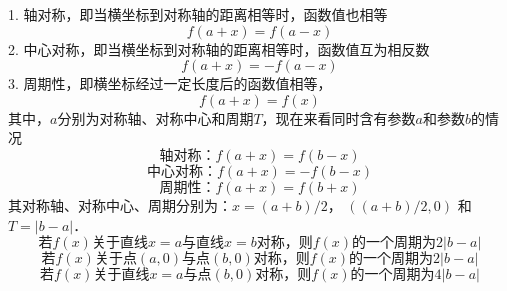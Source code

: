 1. 轴对称，即当横坐标到对称轴的距离相等时，函数值也相等
\begin{equation}
f\left( {a + x} \right) = f\left( {a - x} \right)
\end{equation}
2. 中心对称，即当横坐标到对称轴的距离相等时，函数值互为相反数
\begin{equation}
f\left( {a + x} \right) =  - f\left( {a - x} \right)
\end{equation}
3. 周期性，即横坐标经过一定长度后的函数值相等，
\begin{equation}
f\left( {a + x} \right) = f\left( x \right)
\end{equation}
其中，$a$分别为对称轴、对称中心和周期$T$，现在来看同时含有参数$a$和参数$b$的情况
\begin{equation}
轴对称：f\left( {a + x} \right) = f\left( {b - x} \right)
\end{equation}
\begin{equation}
中心对称：f\left( {a + x} \right) =  - f\left( {b - x} \right)
\end{equation}
\begin{equation}
周期性：f\left( {a + x} \right) = f\left( {b + x} \right)
\end{equation}
其对称轴、对称中心、周期分别为：$x = (a + b)/2$， $((a + b)/2, 0)$ 和 $T = \left| {b - a} \right|$．
\begin{equation}
若f(x)关于直线x=a与直线x=b对称，则f(x)的一个周期为2\left| {b - a} \right|
\end{equation}
\begin{equation}
若f(x)关于点(a,0)与点(b,0)对称，则f(x)的一个周期为2\left| {b - a} \right|
\end{equation}
\begin{equation}
若f(x)关于直线x=a与点(b,0)对称，则f(x)的一个周期为4\left| {b - a} \right|
\end{equation}